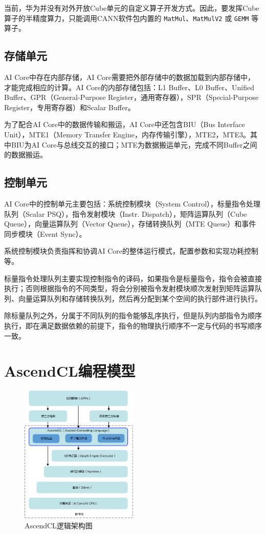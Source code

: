 当前，华为并没有对外开放Cube单元的自定义算子开发方式。因此，要发挥Cube算子的半精度算力，只能调用CANN软件包内置的 \lstinline{MatMul}、\lstinline{MatMulV2} 或 \lstinline{GEMM} 等算子。

\subsection{存储单元}

AI Core中存在内部存储，AI Core需要把外部存储中的数据加载到内部存储中，才能完成相应的计算。AI Core的内部存储包括：L1 Buffer、L0 Buffer、Unified Buffer、GPR（General-Purpose Register，通用寄存器），SPR（Special-Purpose Register，专用寄存器）和Scalar Buffer。

为了配合AI Core中的数据传输和搬运，AI Core中还包含BIU（Bus Interface Unit），MTE1（Memory Transfer Engine，内存传输引擎），MTE2，MTE3。其中BIU为AI Core与总线交互的接口；MTE为数据搬运单元，完成不同Buffer之间的数据搬运。

\subsection{控制单元}

AI Core中的控制单元主要包括：系统控制模块（System Control），标量指令处理队列（Scalar PSQ），指令发射模块（Instr. Dispatch），矩阵运算队列（Cube Queue），向量运算队列（Vector Queue），存储转换队列（MTE Queue）和事件同步模块（Event Sync）。

系统控制模块负责指挥和协调AI Core的整体运行模式，配置参数和实现功耗控制等。

标量指令处理队列主要实现控制指令的译码，如果指令是标量指令，指令会被直接执行；否则根据指令的不同类型，将会分别被指令发射模块顺次发射到矩阵运算队列、向量运算队列和存储转换队列，然后再分配到某个空间的执行部件进行执行。

除标量队列之外，分属于不同队列的指令能够乱序执行，但是队列内部指令为顺序执行，即在满足数据依赖的前提下，指令的物理执行顺序不一定与代码的书写顺序一致。

\section{AscendCL编程模型}

\begin{figure}
    \centering
    \includegraphics[width=0.5\textwidth]{image/chap03/AscendCL}
    \caption{AscendCL逻辑架构图}
    \label{AscendCL逻辑架构图}
\end{figure}

